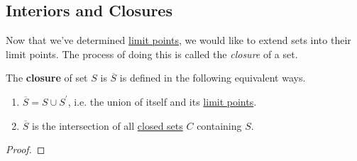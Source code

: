 \subsection{Interiors and Closures}

  Now that we've determined \hyperref[def:limit-point]{limit points}, we would like to extend sets into their limit points. The process of doing this is called the \textit{closure} of a set. 

  \begin{definition}[Closure]
    \label{def:closure}
    The \textbf{closure} of set $S$ is $\overline{S}$ is defined in the following equivalent ways. 
    \begin{enumerate}
      \item $\overline{S} = S \cup S^\prime$, i.e. the union of itself and its \hyperref[def:limit-point]{limit points}. 
      \item $\overline{S}$ is the intersection of all \hyperref[def:closed]{closed sets} $C$ containing $S$. 
    \end{enumerate}
  \end{definition}
  \begin{proof}
    
  \end{proof}

